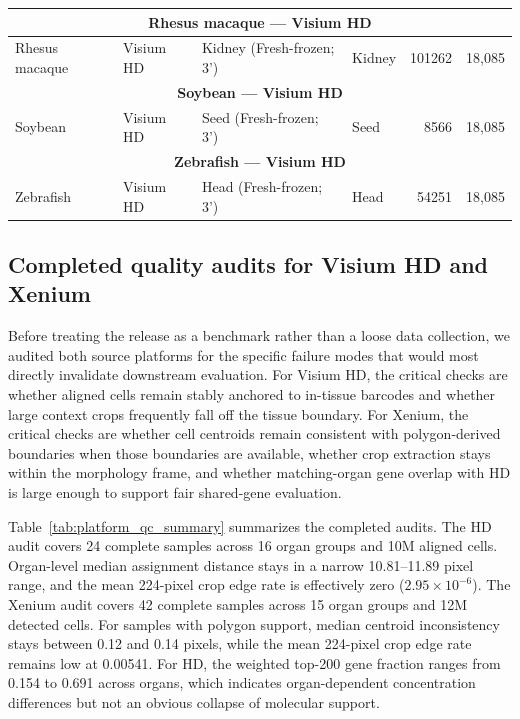 \documentclass{article}
\begin{document}
\begin{table}[tb]
{\begin{tabular}{l l p{7.2cm} l r r}
\midrule
\multicolumn{6}{c}{\textbf{Rhesus macaque — Visium HD}} \\
\midrule
Rhesus macaque & Visium HD & Kidney (Fresh-frozen; 3') & Kidney & 101262 & 18{,}085 \\
\midrule
\multicolumn{6}{c}{\textbf{Soybean — Visium HD}} \\
\midrule
Soybean & Visium HD & Seed (Fresh-frozen; 3') & Seed & 8566 & 18{,}085 \\
\midrule
\multicolumn{6}{c}{\textbf{Zebrafish — Visium HD}} \\
\midrule
Zebrafish & Visium HD & Head (Fresh-frozen; 3') & Head & 54251 & 18{,}085 \\
\bottomrule
\end{tabular}
}
\end{table}

\subsection{Completed quality audits for Visium HD and Xenium}
Before treating the release as a benchmark rather than a loose data collection, we audited both source platforms for the specific failure modes that would most directly invalidate downstream evaluation. For Visium HD, the critical checks are whether aligned cells remain stably anchored to in-tissue barcodes and whether large context crops frequently fall off the tissue boundary. For Xenium, the critical checks are whether cell centroids remain consistent with polygon-derived boundaries when those boundaries are available, whether crop extraction stays within the morphology frame, and whether matching-organ gene overlap with HD is large enough to support fair shared-gene evaluation.

Table~\ref{tab:platform_qc_summary} summarizes the completed audits. The HD audit covers 24 complete samples across 16 organ groups and 10M aligned cells. Organ-level median assignment distance stays in a narrow 10.81--11.89 pixel range, and the mean 224-pixel crop edge rate is effectively zero ($2.95\times10^{-6}$). The Xenium audit covers 42 complete samples across 15 organ groups and 12M detected cells. For samples with polygon support, median centroid inconsistency stays between 0.12 and 0.14 pixels, while the mean 224-pixel crop edge rate remains low at 0.00541. For HD, the weighted top-200 gene fraction ranges from 0.154 to 0.691 across organs, which indicates organ-dependent concentration differences but not an obvious collapse of molecular support.
\end{document}

